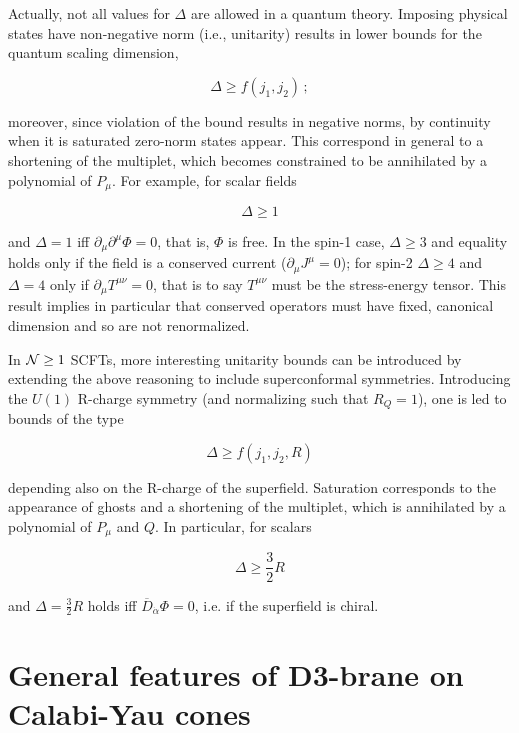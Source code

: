 Actually, not all values for $\Delta$ are allowed in a quantum theory. Imposing physical states have non-negative norm (i.e., unitarity) results in lower bounds for the quantum scaling dimension\cite{unitarity},

\begin{equation}
	\Delta \geq f(j_1,j_2)\,;
	\label{}
\end{equation}

moreover, since violation of the bound results in negative norms, by continuity when it is saturated zero-norm states appear. This correspond in general to a shortening of the multiplet, which becomes constrained to be annihilated by a polynomial of $P_\mu$. For example, for scalar fields

\begin{equation}
	\Delta \geq 1
	\label{uniboundscalar}
\end{equation}

and $\Delta = 1$ iff $\partial_\mu \partial^\mu \Phi = 0$, that is, $\Phi$ is free. In the spin-1 case, $\Delta \geq 3$ and equality holds only if the field is a conserved current ($\partial_\mu J^\mu = 0$); for spin-2 $\Delta \geq 4$ and $\Delta = 4$ only if $\partial_\mu T^{\mu\nu} = 0$, that is to say $T^{\mu\nu}$ must be the stress-energy tensor. This result implies in particular that conserved operators must have fixed, canonical dimension and so are not renormalized.

In $\mathcal{N} \geq 1$ SCFTs, more interesting unitarity bounds can be introduced by extending the above reasoning to include superconformal symmetries. Introducing the $U(1)$ R-charge symmetry (and normalizing such that $R_Q = 1$), one is led to bounds of the type

\begin{equation}
	\Delta \geq f(j_1,j_2,R)
	\label{}
\end{equation}

depending also on the R-charge of the superfield. Saturation corresponds to the appearance of ghosts and a shortening of the multiplet, which is annihilated by a polynomial of $P_\mu$ and $Q$. In particular, for scalars

\begin{equation}
	\Delta \geq \frac{3}{2} R
	\label{}
\end{equation}

and $\Delta = \frac{3}{2} R \label{deltarcharge}$ holds iff $\overline D_{\dot\alpha} \Phi = 0$, i.e. if the superfield is chiral.

\section{General features of D3-brane on Calabi-Yau cones}\label{sec:generalcones}

